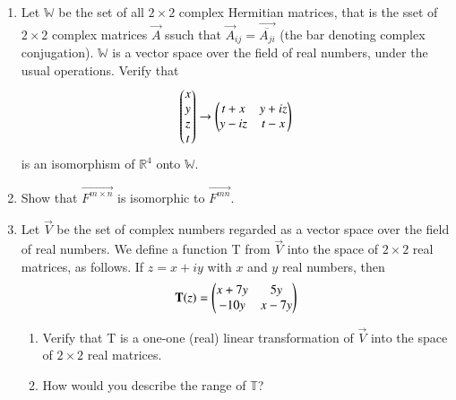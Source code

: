 \begin{enumerate}[label=\thesubsection.\arabic*.,ref=\thesubsection.\theenumi]
\begin{enumerate}
%
%
%
\\
\solution

\end{enumerate}
%
\item Let $\mathbb{W}$ be the set of all $2\times2$ complex Hermitian matrices, that is the sset of $2\times2$ complex matrices $\vec{A}$ ssuch that $\vec{A}_{ij}=\vec{\overline{A_{ji}}}$ (the bar denoting complex conjugation). $\mathbb{W}$ is a vector space over the field of real numbers, under the usual operations. Verify that
\begin{align}\label{iso}
\begin{pmatrix}x\\y\\z\\t\end{pmatrix} \rightarrow \begin{pmatrix}t+x&y+iz\\y-iz&t-x\end{pmatrix}
\end{align}
is an isomorphism of $\mathbb{R}^4$ onto $\mathbb{W}$.
%
\\
\solution

\item Show that $\vec{F^{m\times n}}$ is isomorphic to $\vec{F^{mn}}$.
%
\\
\solution

\item Let $\vec{V}$ be the set of complex numbers regarded as a vector space over the field of real numbers. We define a function T from $\vec{V}$ into the space of $2 \times 2$ real matrices, as follows. If $z = x + iy$ with $x$ and $y$ real numbers, then
\begin{align}
    \mathbf{T}(z) = \begin{pmatrix}x + 7y & 5y \\ -10y & x-7y\end{pmatrix} \nonumber
\end{align}
\begin{enumerate}
\item  Verify that T is a one-one (real) linear transformation of $\vec{V}$ into the space of $2 \times 2$ real matrices.
%
\\
\solution

\item How would you describe the range of $\mathbb{T}$?
%
\\
\solution



\end{enumerate}
\end{enumerate}
